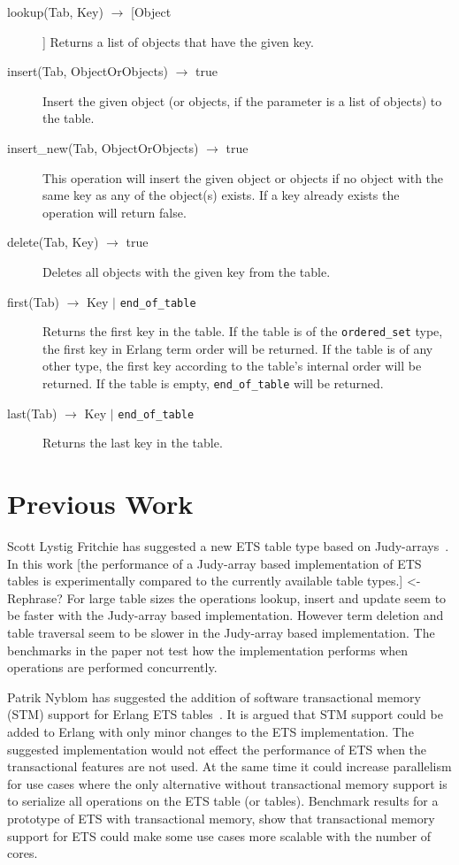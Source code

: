 \documentclass[aps,pre,preprint,nofootinbib]{revtex4}
\begin{document}
\begin{description}
 \item[lookup(Tab, Key) $\rightarrow$ [Object]] 
 Returns a list of objects that have the given key. 
 \item[insert(Tab, ObjectOrObjects) $\rightarrow$ true]
 Insert the given object (or objects, if the parameter is a list of objects) to the table.
 \item[insert\_new(Tab, ObjectOrObjects) $\rightarrow$ true]
 This operation will insert the given object or objects if no object with the same key as any of the object(s) exists. 
 If a key already exists the operation will return false.
 \item[delete(Tab, Key) $\rightarrow$ true] Deletes all objects with the given key from the table.
 \item[first(Tab) $\rightarrow$ Key $|$ \texttt{end\_of\_table} ] Returns the first key in the table. If the table is of the \verb|ordered_set| type, the first key in Erlang term order will be returned. If the table is of any other type, the first key according to the table's internal order will be returned. If the table is empty, \verb|end_of_table| will be returned.
 \item[last(Tab) $\rightarrow$ Key $|$ \texttt{end\_of\_table} ] Returns the last key in the table.
\end{description}

\section{Previous Work}

  Scott Lystig Fritchie has suggested a new ETS table type based on Judy-arrays~\cite{ScottEtsJudy}.
  In this work [the performance of a Judy-array based implementation of ETS tables is experimentally compared to the currently available table types.] <- Rephrase?
  For large table sizes the operations lookup, insert and update seem to be faster with the Judy-array based implementation.
  However term deletion and table traversal seem to be slower in the Judy-array based implementation.
  The benchmarks in the paper not test how the implementation performs when operations are performed concurrently.
  
  Patrik Nyblom has suggested the addition of software transactional memory (STM) support for Erlang ETS tables~\cite{PatrikErlangTrans}.
  It is argued that STM support could be added to Erlang with only minor changes to the ETS implementation.
  The suggested implementation would not effect the performance of ETS when the transactional features are not used.
  At the same time it could increase parallelism for use cases where the only alternative without transactional memory support is to serialize all operations on the ETS table (or tables).
  Benchmark results for a prototype of ETS with transactional memory, show that transactional memory support for ETS could make some use cases more scalable with the number of cores.
  
\end{document}
